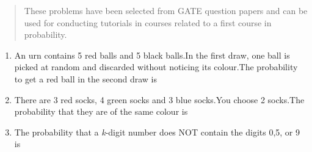 \documentclass[journal,12pt,twocolumn]{IEEEtran}
\begin{document}
\maketitle

\begin{abstract}
These problems have been selected from GATE question papers and can be used for conducting tutorials in courses related to a first course in probability.
\end{abstract}

\begin{enumerate}
\setlength\itemsep{2em}

\item An urn contains 5 red balls and 5 black balls.In the first draw, one ball is picked at random and discarded without noticing its colour.The probability to get a red ball in the second draw is

\begin{enumerate}
\end{enumerate}
\solution


\item There are 3 red socks, 4 green socks and 3 blue socks.You choose 2 socks.The probability that they are of the same colour is

\begin{enumerate}
\end{enumerate}
\solution




\item The probability that a \textit{k}-digit number does NOT contain the digits 0,5, or 9 is


\end{enumerate}
\end{document}
